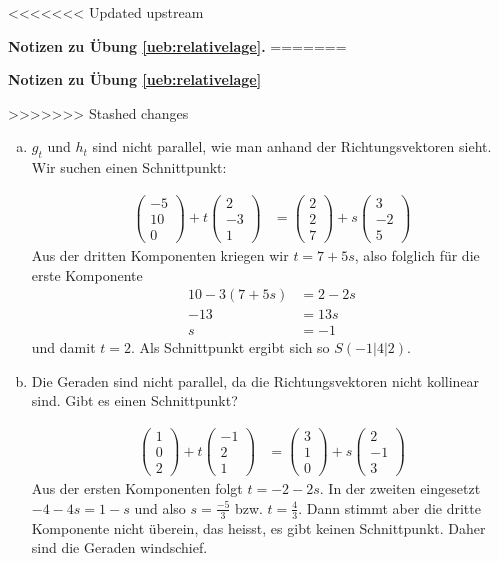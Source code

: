 \documentclass[%
11pt,%
twoside,%
titlepage,%
<<<<<<< Updated upstream
german,%
=======
swissgerman,%
>>>>>>> Stashed changes
headsepline%
]{scrartcl}
\newcommand{\faReturnGray}{\textcolor{gray}{\faMailReply}} %
\theoremstyle{definition}
\theoremstyle{plain}
\newcommand{\concatueb}[1]{ueb:#1}%
\newcommand{\concatlsg}[1]{lsg:#1}%
\newenvironment{lsg}[1]{%
<<<<<<< Updated upstream
    \par\noindent\textbf{Notizen zu Übung \ref{\concatueb{#1}}.}%
    \label{\concatlsg{#1}}
=======
    \par\noindent\textbf{Notizen zu Übung \ref{\concatueb{#1}}}\label{\concatlsg{#1}}
    \hfill\hyperref[\concatueb{#1}]{\faReturnGray}\par %
>>>>>>> Stashed changes
}{%
    \par%
}
\begin{document}
\begin{lsg}{relativelage}
\begin{enumerate}[a)]
    \item $g_t$ und $h_t$ sind nicht parallel, wie man anhand der Richtungsvektoren sieht. Wir suchen einen Schnittpunkt:

    \begin{align*}
        \begin{pmatrix}-5\\10\\0\end{pmatrix}+t\begin{pmatrix}2\\-3\\1\end{pmatrix} &= \begin{pmatrix}2\\2\\7\end{pmatrix}+s\begin{pmatrix}3\\-2\\5\end{pmatrix}
    \end{align*}
    Aus der dritten Komponenten kriegen wir $t=7+5s$, also folglich für die erste Komponente
    \begin{align*}
        10-3(7+5s) &= 2-2s\\
        -13 &= 13s\\
        s &= -1
    \end{align*}
    und damit $t=2$. Als Schnittpunkt ergibt sich so $S(-1|4|2)$.

    \item Die Geraden sind nicht parallel, da die Richtungsvektoren nicht kollinear sind. Gibt es einen Schnittpunkt?

    \begin{align*}
    \begin{pmatrix}1\\0\\2\end{pmatrix}+t\begin{pmatrix}-1\\2\\1\end{pmatrix} &= \begin{pmatrix}3\\1\\0\end{pmatrix}+s\begin{pmatrix}2\\-1\\3\end{pmatrix}
    \end{align*}
    Aus der ersten Komponenten folgt $t=-2-2s$. In der zweiten eingesetzt $-4-4s=1-s$ und also $s=\frac{-5}{3}$ bzw. $t=\frac{4}{3}$. Dann stimmt aber die dritte Komponente nicht überein, das heisst, es gibt keinen Schnittpunkt. Daher sind die Geraden windschief.
\end{enumerate}
\end{lsg}
\end{document}
